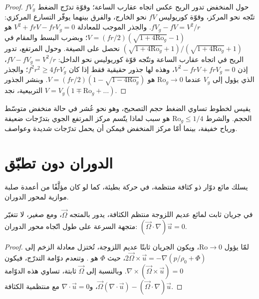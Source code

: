 \begin{proof}
حول المنخفض تدور الريح عكس اتجاه عقارب الساعة؛ وقوّة تدرّج الضغط
$fV_g$ تتّجه نحو المركز، وقوّة كوريوليس $fV$ نحو الخارج، والفرق بينهما
يوفّر التسارع المركزي: $fV_g - fV = V^2/r$. والجذر الموجب للمعادلة
$V^2 + frV - frV_g = 0$ هو $V = (fr/2)(\sqrt{1 +
4\mathrm{Ro}_g} - 1)$؛ وبضرب البسط والمقام في $(\sqrt{1 + 4\mathrm{Ro}_g} +
1)/(\sqrt{1 + 4\mathrm{Ro}_g} + 1)$ نحصل على الصيغة. وحول المرتفع،
تدور الريح في اتجاه عقارب الساعة وتتّجه قوّة كوريوليس نحو الداخل: $fV - fV_g =
V^2/r$، إذن $V^2 - frV + frV_g = 0$، وهذه لها جذور حقيقية فقط إذا كان $f^2r^2
\ge 4frV_g$؛ والجذر الذي يؤول إلى $V_g$ عندما $\mathrm{Ro}_g \to 0$ هو
$V = (fr/2)(1 - \sqrt{1 - 4\mathrm{Ro}_g})$. وبنشر الجذور التربيعية،
نجد $V = V_g(1 \mp \mathrm{Ro}_g + \dots)$.
\end{proof}

يقيس  لخطوط تساوي الضغط حجم التصحيح، وهو نحو عُشر في
حالة منخفض متوسّط الحجم. والشرط $\mathrm{Ro}_g \le 1/4$ هو سبب
لماذا يتّسم مركز المرتفع الجوي بتدرّجات ضعيفة ورياح خفيفة، بينما
أمّا مركز المنخفض فيمكن أن يحمل تدرّجات شديدة وعواصف.

\section{الدوران دون تطبّق}\label{sec:b3:gfd-foundations:taylor}

يسلك مائع دوّار ذو كثافة منتظمة، في حركة بطيئة، كما لو كان
مؤلَّفًا من أعمدة صلبة موازية لمحور الدوران.

\begin{theorem}\label{thm:b3:gfd-foundations:taylor-proudman}
في جريان ثابت لمائع عديم اللزوجة منتظم الكثافة، يدور بالمتجه
$\vec\Omega$، ومع  صغير، لا تتغيّر متجهة السرعة على طول
اتّجاه محور الدوران: $(\vec\Omega\cdot\nabla)\vec u = 0$.
\end{theorem}

\begin{proof}
لمّا يؤول $\mathrm{Ro}\to 0$، ويكون الجريان ثابتًا عديم اللزوجة، تُختزل معادلة الزخم
إلى $2\vec\Omega\times\vec u = -\nabla(p/\rho_0 + \Phi)$، حيث $\Phi$ هو
. وتنعدم دوّامة التدرّج، فيكون $\nabla\times(\vec\Omega
\times\vec u) = 0$. وبالنسبة إلى $\vec\Omega$ ثابتة، تساوي هذه الدوّامة $\vec\Omega
(\nabla\cdot\vec u) - (\vec\Omega\cdot\nabla)\vec u$، و$\nabla\cdot\vec u
= 0$ مع منتظمية الكثافة.
\end{proof}

